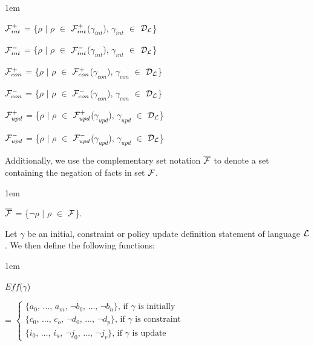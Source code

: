 \documentclass[glov2,twocolumn,final]{svjour2}
\newenvironment{vquote}
  {\begin{list}{}{\leftmargin 1em}\item[]}
  {\end{list}}
\begin{document}
    \begin{vquote}
      ${\cal F}^{+}_{int}$ =
      \{$\rho$ $\mid$ $\rho$ $\in$ ${\cal F}^{+}_{int}$($\gamma_{int}$), $\gamma_{int}$ $\in$ ${\cal D}_{\cal L}$\}

      ${\cal F}^{-}_{int}$ =
      \{$\rho$ $\mid$ $\rho$ $\in$ ${\cal F}^{-}_{int}$($\gamma_{int}$), $\gamma_{int}$ $\in$ ${\cal D}_{\cal L}$\}

      ${\cal F}^{+}_{con}$ =
      \{$\rho$ $\mid$ $\rho$ $\in$ ${\cal F}^{+}_{con}$($\gamma_{con}$), $\gamma_{con}$ $\in$ ${\cal D}_{\cal L}$\}

      ${\cal F}^{-}_{con}$ =
      \{$\rho$ $\mid$ $\rho$ $\in$ ${\cal F}^{-}_{con}$($\gamma_{con}$), $\gamma_{con}$ $\in$ ${\cal D}_{\cal L}$\}

      ${\cal F}^{+}_{upd}$ =
      \{$\rho$ $\mid$ $\rho$ $\in$ ${\cal F}^{+}_{upd}$($\gamma_{upd}$), $\gamma_{upd}$ $\in$ ${\cal D}_{\cal L}$\}

      ${\cal F}^{-}_{upd}$ =
      \{$\rho$ $\mid$ $\rho$ $\in$ ${\cal F}^{-}_{upd}$($\gamma_{upd}$), $\gamma_{upd}$ $\in$ ${\cal D}_{\cal L}$\}
    \end{vquote}

    Additionally, we use the complementary set notation
    $\overline{{\cal F}}$ to denote a set containing the negation of
    facts in set ${\cal F}$.

    \begin{vquote}
      $\overline{{\cal F}}$ =
      \{$\lnot\rho$ $\mid$ $\rho$ $\in$ ${\cal F}$\}.
    \end{vquote}

    Let $\gamma$ be an initial, constraint or policy update definition
    statement of language ${\cal L}$. We then define the following functions:

    \begin{vquote}
      $Eff$($\gamma$)

      \hspace{1em}
      =
      \begin{math}
        \begin{cases}
          \mbox{\{$a_{0}$, \ldots, $a_{m}$, $\lnot$$b_{0}$, \ldots, $\lnot$$b_{n}$\}, if $\gamma$ is initially} \\
          \mbox{\{$c_{0}$, \ldots, $c_{o}$, $\lnot$$d_{0}$, \ldots, $\lnot$$d_{p}$\}, if $\gamma$ is constraint} \\
          \mbox{\{$i_{0}$, \ldots, $i_{u}$, $\lnot$$j_{0}$, \ldots, $\lnot$$j_{v}$\}, if $\gamma$ is update}
        \end{cases}
      \end{math}
    \end{vquote}
\end{document}
